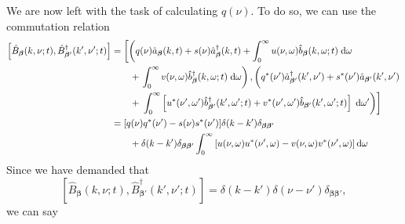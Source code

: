 \documentclass{article}
\begin{document}
We are now left with the task of calculating $q(\nu)$. To do so, we can use the commutation relation
\begin{equation}
\begin{split}
\left[\hat{B}_{\bm{\beta}}(k,\nu;t),\hat{B}_{\bm{\beta}'}^\dagger(k',\nu';t)\right] &= \left[\left(q(\nu)\hat{a}_{\bm{\beta}}(k,t) + s(\nu)\hat{a}_{\bm{\beta}}^\dagger(k,t) + \int_0^\infty u(\nu,\omega)\hat{b}_{\bm{\beta}}(k,\omega;t)\;\mathrm{d}\omega\right.\right.\\
&\qquad + \left. \int_0^\infty v(\nu,\omega)\hat{b}_{\bm{\beta}}^\dagger(k,\omega;t)\;\mathrm{d}\omega \right),\left(q^*(\nu')\hat{a}_{\bm{\beta}'}^\dagger(k',\nu') + s^*(\nu')\hat{a}_{\bm{\beta}'}(k',\nu')  \vphantom{\int_0^\infty}\right.\\
&\qquad + \left.\left.\int_0^\infty\left[u^*(\nu',\omega')\hat{b}_{\bm{\beta}'}^\dagger(k',\omega';t) + v^*(\nu',\omega')\hat{b}_{\bm{\beta}'}(k',\omega';t)\right]\;\mathrm{d}\omega'\right)\right]\\
&= [q(\nu)q^*(\nu') - s(\nu)s^*(\nu')]\delta(k - k')\delta_{\bm{\beta}\bm{\beta}'}\\
&\qquad + \delta(k - k')\delta_{\bm{\beta}\bm{\beta}'}\int_0^\infty\left[u(\nu,\omega)u^*(\nu',\omega) - v(\nu,\omega)v^*(\nu',\omega)\right]\mathrm{d}\omega
\end{split}
\end{equation}
Since we have demanded that
\begin{equation}
\left[\hat{B}_{\bm{\beta}}(k,\nu;t),\hat{B}_{\bm{\beta}'}^\dagger(k',\nu';t)\right] = \delta(k - k')\delta(\nu - \nu')\delta_{\bm{\beta}\bm{\beta}'},
\end{equation}
we can say
\end{document}
